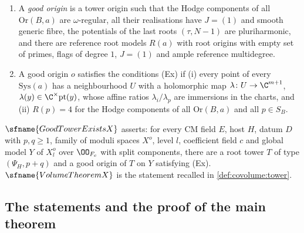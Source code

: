 \begin{definition}
\begin{enumerate}[label=(\alph*)]
  $\OO_{F_c}$ consists of: $T.j=p$; $r\in T.\mathrm{bad}$ if and only if $r$ is a prime dividing
  $2d_EM'$; for each component $a$ an analytic system $\mathrm{Sys}(a)$ and fixed data $F_x(a)$, whose
  points $\xi_f$ have pairwise distinct generic points exhausting the generic points of $Y.X$, with
  $F_x(a).n(r)=k_Aq'\,\nu(r)$; and root origins $\mathrm{Or}(B,a)$ of $T.M(B,a)$ over $F_x(a)$ with
  primes $S_B$.
\item A \emph{good origin} is a tower origin such that the Hodge components of all $\mathrm{Or}(B,a)$
  are $\omega$-regular, all their realisations have $J=(1)$ and smooth generic fibre, the potentials of the
  last roots $(\tau,N-1)$ are pluriharmonic, and there are reference root models $R(a)$ with root origins
  with empty set of primes, flags of degree $1$, $J=(1)$ and ample reference multidegree.
\item A good origin $o$ satisfies the conditions \textup{(Ex)} if (i) every point of every
  $\mathrm{Sys}(a)$ has a neighbourhood $U$ with a holomorphic map $\lambda\colon U\to\C^{m+1}$,
  $\lambda(y)\in\C^\times\mathrm{pt}(y)$, whose affine ratios $\lambda_i/\lambda_p$ are immersions in the
  charts, and (ii) $R(p)=4$ for the Hodge components of all $\mathrm{Or}(B,a)$ and all $p\in S_B$.
\end{enumerate}
\end{definition}

$\sfname{GoodTowerExistsX}$ asserts: for every CM field $E$, host $H$, datum $D$ with $p,q\ge1$, family of
moduli spaces $X^o$, level $l$, coefficient field $c$ and global model $Y$ of $X^o_l$ over $\OO_{F_c}$ with
split components, there are a root tower $T$ of type $(\Psi_H,p+q)$ and a good origin of $T$ on $Y$
satisfying (Ex). $\sfname{VolumeTheoremX}$ is the statement recalled in \cref{def:covolume:tower}.

\subsection{The statements and the proof of the main theorem}\label{pf:towergeo:sec-statements}

